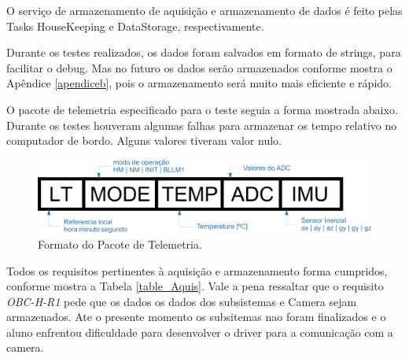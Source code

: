 O serviço de armazenamento de aquisição e armazenamento de dados é feito pelas Tasks HouseKeeping e DataStorage, respectivamente. 

Durante os testes realizados, os dados foram salvados em formato de strings, para facilitar o debug. Mas no futuro os dados serão armazenados conforme mostra o Apêndice \ref{apendiceb}, pois o armazenamento será muito mais eficiente e rápido. 

O pacote de telemetria especificado para o teste seguia a forma mostrada abaixo. Durante os testes houveram algumas falhas para armazenar os tempo relativo no computador de bordo. Alguns valores tiveram valor nulo.

\begin{figure}[h]
	\centering
	\caption{Formato do Pacote de Telemetria.}
	\includegraphics[keepaspectratio=true,scale=0.5]{figuras/telemetryPacket.png}
	
	\label{telemetryPacket}
\end{figure}

Todos os requisitos pertinentes à aquisição e armazenamento forma cumpridos, conforme mostra a Tabela \ref{table_Aquis}. Vale a pena ressaltar que o requisito \textit{OBC-H-R1} pede que os dados os dados dos subsistemas e Camera sejam armazenados. Ate o presente momento os subsitemas nao foram finalizados e o aluno enfrentou dificuldade para desenvolver o driver para a comunicação com a camera. 

